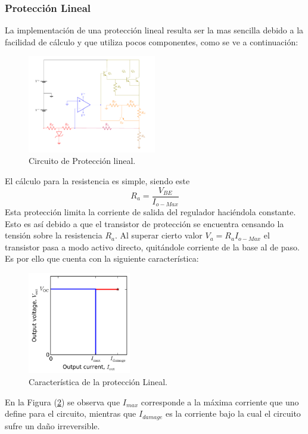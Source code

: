 \subsubsection{Protección Lineal}
La implementación de una protección lineal resulta ser la mas sencilla debido a la facilidad de cálculo y que utiliza pocos componentes, como se ve a continuación:
\begin{figure}[H]
\centering
	\includegraphics[width=0.5\textwidth, page=3]{ImagenesEjercicio2/Regulador.pdf}
	\caption{Circuito de Protección lineal.}
	\label{fig:circuitolineal}
\end{figure}
El cálculo para la resistencia es simple, siendo este 
$$R_a= \frac{V_{BE}}{I_{o-Max}}$$
Esta protección limita la corriente de salida del regulador haciéndola constante. Esto es así debido a que el transistor de protección se encuentra censando la tensión sobre la resistencia $R_a$. Al superar cierto valor $V_a = R_a I_{o-Max}$ el transistor pasa a modo activo directo, quitándole corriente de la base al de paso. Es por ello que cuenta con la siguiente característica:
\begin{figure}[H]
\centering
	\includegraphics[width=0.4\textwidth]{ImagenesEjercicio2/Linearprotection.png}
	\caption{Característica de la protección Lineal.}
	\label{fig:circuitolinealcarac}
\end{figure}
En la Figura (\ref{fig:circuitolinealcarac}) se observa que $I_{max}$ corresponde a la máxima corriente que uno define para el circuito, mientras que $I_{damage}$ es la corriente bajo la cual el circuito sufre un daño irreversible.


